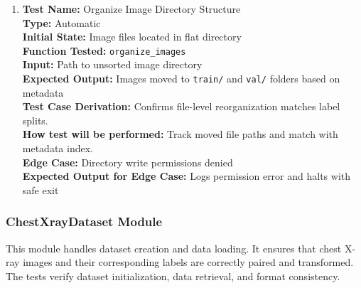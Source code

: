 \documentclass[12pt, titlepage]{article}
\begin{document}
\begin{enumerate}
  \item \textbf{Test Name:} Organize Image Directory Structure\\
  \textbf{Type:} Automatic\\
  \textbf{Initial State:} Image files located in flat directory\\
  \textbf{Function Tested:} \verb|organize_images|\\
  \textbf{Input:} Path to unsorted image directory\\
  \textbf{Expected Output:} Images moved to \verb|train/| and \verb|val/| folders based on metadata\\
  \textbf{Test Case Derivation:} Confirms file-level reorganization matches label splits.\\
  \textbf{How test will be performed:} Track moved file paths and match with metadata index.\\
  \textbf{Edge Case:} Directory write permissions denied\\
  \textbf{Expected Output for Edge Case:} Logs permission error and halts with safe exit\\
\end{enumerate}


\subsubsection{ChestXrayDataset Module}
This module handles dataset creation and data loading. It ensures that chest X-ray images and their corresponding labels are correctly paired and transformed. The tests verify dataset initialization, data retrieval, and format consistency.
\end{document}
